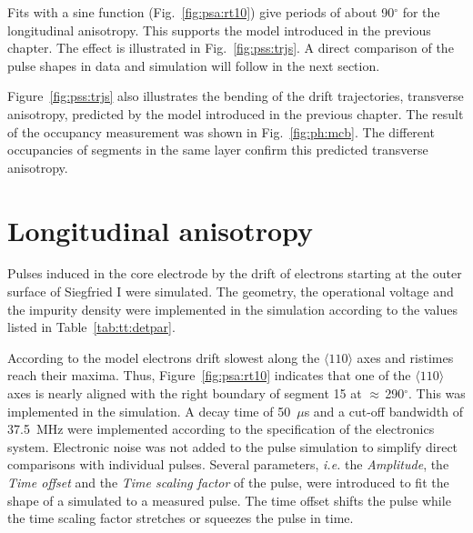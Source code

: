 Fits with a sine function (Fig.~\ref{fig:psa:rt10}) give periods of about 90$^{\circ}$ for the longitudinal anisotropy. This supports the model introduced in the previous chapter. The effect is illustrated in Fig.~\ref{fig:pss:trjs}. A direct comparison of the pulse shapes in data and simulation will follow
in the next section.

Figure~\ref{fig:pss:trjs} also illustrates the bending of the drift trajectories, transverse anisotropy, predicted by the model introduced in the previous chapter. The result of the occupancy measurement was shown in Fig.~\ref{fig:ph:mcb}. The different occupancies of segments in the same layer confirm this predicted transverse anisotropy.

\section{Longitudinal anisotropy}
\label{sec:psa:lon}
Pulses induced in the core electrode by the drift of electrons starting at the outer surface of Siegfried I were simulated. The geometry, the operational voltage and the impurity density were implemented in the simulation according to the values listed in Table~\ref{tab:tt:detpar}. 

According to the model electrons drift slowest along the $\langle 110 \rangle$ axes and ristimes reach their maxima. Thus, Figure~\ref{fig:psa:rt10} indicates that one of the $\langle 110 \rangle$ axes is nearly aligned with the right boundary of segment 15 at $\approx$\,290$^\circ$. This was implemented in the simulation. A decay time of 50~$\mu$s and a cut-off bandwidth of 37.5~MHz were implemented according to the specification of the electronics system. Electronic noise was not added to the pulse simulation to simplify
direct comparisons with individual pulses. Several parameters, \textit{i.e.} the \emph{Amplitude}, the \emph{Time offset} and the \emph{Time scaling factor} of the pulse, were introduced to fit the shape of a simulated to a measured pulse. The time offset shifts the pulse while the time scaling factor stretches or 
squeezes the pulse in time.

